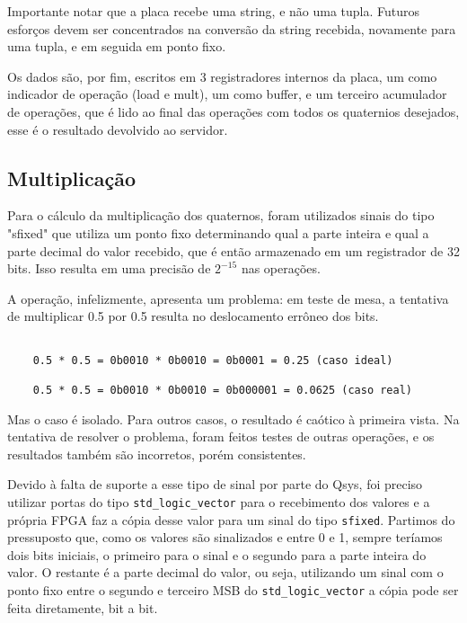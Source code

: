 \documentclass [12pt,oneside] {article}
\begin{document}
	Importante notar que a placa recebe uma string, e não uma
tupla. Futuros esforços devem ser concentrados na conversão da string
recebida, novamente para uma tupla, e em seguida em ponto fixo.

	Os dados são, por fim, escritos em 3 registradores internos da
placa, um como indicador de operação (load e mult), um como buffer, e
um terceiro acumulador de operações, que é lido ao final das operações
com todos os quaternios desejados, esse é o resultado devolvido ao servidor.

\subsection{Multiplicação}

	Para o cálculo da multiplicação dos quaternos, foram
utilizados sinais do tipo "sfixed" que utiliza um ponto fixo
determinando qual a parte inteira e qual a parte decimal do valor
recebido, que é então armazenado em um registrador de 32 bits. Isso
resulta em uma precisão de $2^{-15}$ nas operações.

	A operação, infelizmente, apresenta um problema: em teste de
mesa, a tentativa de multiplicar 0.5 por 0.5 resulta no deslocamento
errôneo dos bits.

\begin{footnotesize} \begin{verbatim}

	0.5 * 0.5 = 0b0010 * 0b0010 = 0b0001 = 0.25 (caso ideal)

	0.5 * 0.5 = 0b0010 * 0b0010 = 0b000001 = 0.0625 (caso real)

\end{verbatim} \end{footnotesize}

Mas o caso é isolado. Para outros casos, o resultado é caótico à
primeira vista. Na tentativa de resolver o problema, foram feitos
testes de outras operações, e os resultados também são incorretos,
porém consistentes.

	Devido à falta de suporte a esse tipo de sinal por parte do
Qsys, foi preciso utilizar portas do tipo \texttt{std\_logic\_vector}
para o recebimento dos valores e a própria FPGA faz a cópia desse
valor para um sinal do tipo \texttt{sfixed}. Partimos do pressuposto que,
como os valores são sinalizados e entre 0 e 1, sempre teríamos dois
bits iniciais, o primeiro para o sinal e o segundo para a parte
inteira do valor. O restante é a parte decimal do valor, ou seja,
utilizando um sinal com o ponto fixo entre o segundo e terceiro MSB do
\texttt{std\_logic\_vector} a cópia pode ser feita diretamente, bit a
bit.
\end{document}
